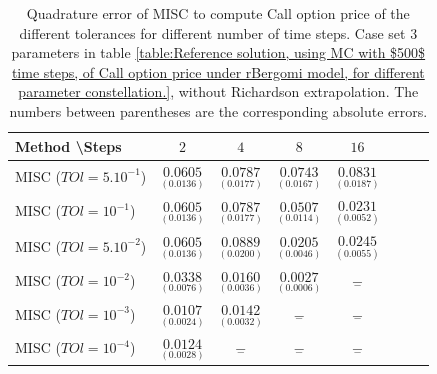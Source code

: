 \documentclass[11pt]{article}
\begin{document}
\begin{table}[h!]
	\centering
	\begin{tabular}{l*{6}{c}r}
		Method \textbackslash  Steps            & $2$ & $4$ & $8$ & $16$  \\
		\hline
		MISC ($TOl=5.10^{-1}$)  & $\underset{( 0.0136)}{\mathbf{ 0.0605}}$ & $\underset{(0.0177)}{\mathbf{0.0787}}$ & $\underset{( 0.0167
			)}{\mathbf{   0.0743
		}}$ & $\underset{(0.0187)}{\mathbf{ 0.0831}}$  \\
		MISC ($TOl=10^{-1}$)  & $\underset{( 0.0136)}{\mathbf{ 0.0605}}$ & $\underset{(0.0177)}{\mathbf{0.0787}}$ & $\underset{(0.0114)}{\mathbf{ 0.0507}}$ & $\underset{(  0.0052)}{\mathbf{0.0231}}$  \\
		MISC ($TOl=5.10^{-2}$)  &$\underset{( 0.0136)}{\mathbf{ 0.0605}}$ & $\underset{( 0.0200
			)}{\mathbf{
				0.0889}}$ & $\underset{(  0.0046)}{\mathbf{
				0.0205
		}}$ & $\underset{(0.0055)}{\mathbf{  0.0245}}$  \\
		MISC ($TOl=10^{-2}$)  & $\underset{(0.0076)}{\mathbf{ 0.0338}}$ & $\underset{(0.0036)}{\mathbf{   0.0160}}$ & $\underset{(0.0006)}{\mathbf{0.0027}}$ & $\underset{-}{\mathbf{-}}$  \\
		MISC ($TOl=10^{-3}$)  & $\underset{(  0.0024
			)}{\mathbf{ 0.0107}}$ & $\underset{(  0.0032)}{\mathbf{
				0.0142
		}}$ & $\underset{-}{\mathbf{-}}$ & $\underset{-}{\mathbf{-}}$  \\
		MISC ($TOl=10^{-4}$)  & $\underset{(   0.0028
			)}{\mathbf{   0.0124
		}}$ & $\underset{-}{\mathbf{-}}$ & $\underset{-}{\mathbf{-}}$ & $\underset{-}{\mathbf{-}}$  \\
		\hline
	\end{tabular}
	\caption{Quadrature error of MISC to compute Call option price of the different tolerances for different number of time steps. Case  set $3$ parameters in table \ref{table:Reference solution, using MC with $500$ time steps, of Call option price under rBergomi model, for different parameter constellation.}, without Richardson extrapolation. The numbers between parentheses are the corresponding absolute errors.}
	\label{Quadrature error of MISC to compute Call option price of the different tolerances for different number of time steps. Case  set $3$ parameters, without Richardson extrapolation. The numbers between parentheses are the corresponding absolute errors.}
\end{table}
\end{document}
